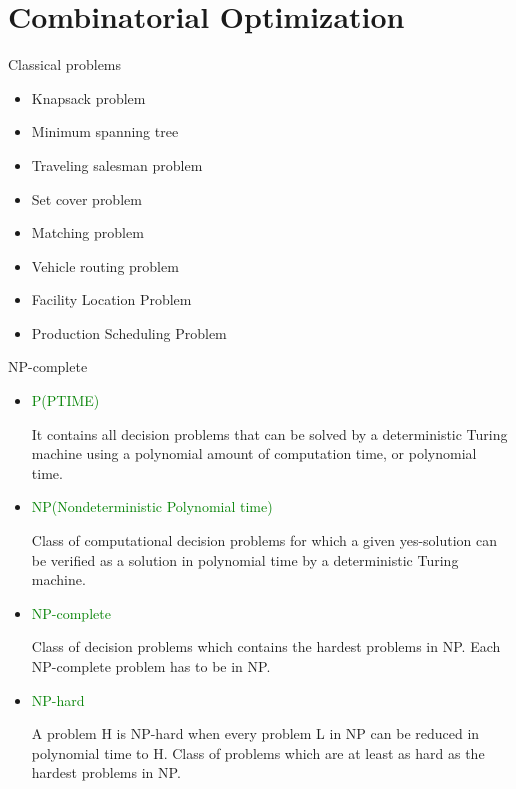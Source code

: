 \section{Combinatorial Optimization}

    \frame{\sectionpage}

    \begin{frame}{Classical problems}
      \large
      \begin{spacing}{1.5}
      \begin{itemize}
        \item Knapsack problem
        \item Minimum spanning tree
        \item Traveling salesman problem
        \item Set cover problem
        \item Matching problem
        \item Vehicle routing problem
        \item Facility Location Problem
        \item Production Scheduling Problem
      \end{itemize}
      \end{spacing}
   \end{frame}

   \begin{frame}{NP-complete}
     \begin{itemize}
       \item \textcolor{green}{P(PTIME)}

       It contains all decision problems that can be solved by a deterministic Turing machine using a polynomial amount of computation time, or polynomial time.
       \item \textcolor{green}{NP(Nondeterministic Polynomial time)}

       Class of computational decision problems for which a given yes-solution can be verified as a solution in polynomial time by a deterministic Turing machine.
       \item \textcolor{green}{NP-complete}

       Class of decision problems which contains the hardest problems in NP. Each NP-complete problem has to be in NP.
       \item \textcolor{green}{NP-hard}
       
       A problem H is NP-hard when every problem L in NP can be reduced in polynomial time to H.
       Class of problems which are at least as hard as the hardest problems in NP.
     \end{itemize}

   \end{frame}


